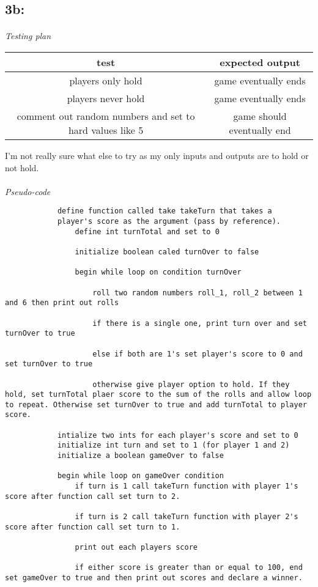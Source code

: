 \documentclass[a4paper, 11pt]{article}
\begin{document}
\subsection*{3b: }
	
	\paragraph{}
		\textit{Testing plan} 
		\begin{center}
			\begin{tabular}{|c|c|}
				\hline
				\textbf{test} & \textbf{expected output} \\ 
				\hline 
				players only hold & game eventually ends \\ 
				\hline
				players never hold & game eventually ends \\ 
				\hline 
				comment out random numbers and set to hard values like 5 & game should eventually end \\ 
				\hline 
			\end{tabular}
		\end{center}
	I'm not really sure what else to try as my only inputs and outputs are to hold or not hold. 
	
	\paragraph{}
		\textit{Pseudo-code}
		\begin{lstlisting}	
			define function called take takeTurn that takes a 
			player's score as the argument (pass by reference).
				define int turnTotal and set to 0
				
				initialize boolean caled turnOver to false 
				
				begin while loop on condition turnOver
				
					roll two random numbers roll_1, roll_2 between 1 and 6 then print out rolls
				
					if there is a single one, print turn over and set turnOver to true
				
					else if both are 1's set player's score to 0 and set turnOver to true
				
					otherwise give player option to hold. If they hold, set turnTotal plaer score to the sum of the rolls and allow loop to repeat. Otherwise set turnOver to true and add turnTotal to player score. 
			
			intialize two ints for each player's score and set to 0
			initialize int turn and set to 1 (for player 1 and 2)
			initialize a boolean gameOver to false
			
			begin while loop on gameOver condition 
				if turn is 1 call takeTurn function with player 1's score after function call set turn to 2. 
				
				if turn is 2 call takeTurn function with player 2's score after function call set turn to 1. 
				
				print out each players score 
				
				if either score is greater than or equal to 100, end set gameOver to true and then print out scores and declare a winner. 
				
				
		\end{lstlisting} 
\end{document}
